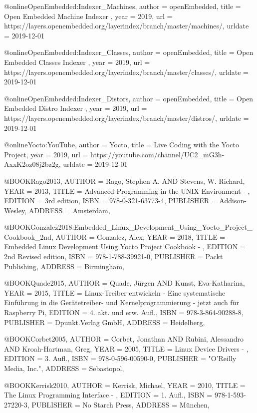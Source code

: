 @online{OpenEmbedded:Indexer_Machines,
author = {openEmbedded},
title = {Open Embedded Machine Indexer },
year = 2019,
url = {https://layers.openembedded.org/layerindex/branch/master/machines/},
urldate = {2019-12-01}
}

@online{OpenEmbedded:Indexer_Classes,
author = {openEmbedded},
title = {Open Embedded Classes Indexer },
year = 2019,
url = {https://layers.openembedded.org/layerindex/branch/master/classes/},
urldate = {2019-12-01}
}

@online{OpenEmbedded:Indexer_Distors,
author = {openEmbedded},
title = {Open Embedded Distro Indexer },
year = 2019,
url = {https://layers.openembedded.org/layerindex/branch/master/distros/},
urldate = {2019-12-01}
}

@online{Yocto:YouTube,
author = {Yocto},
title = {Live Coding with the Yocto Project},
year = 2019,
url = {https://youtube.com/channel/UC2_mG3h-AxxK2oz08j2bz2g},
urldate = {2019-12-01}
}

@BOOK{Rago2013,
	AUTHOR = {Rago, Stephen A. AND Stevens, W. Richard},
	YEAR = {2013},
	TITLE = {Advanced Programming in the UNIX Environment - },
	EDITION = {3rd edition},
	ISBN = {978-0-321-63773-4},
	PUBLISHER = {Addison-Wesley},
	ADDRESS = {Amsterdam},
}


@BOOK{Gonzalez2018:Embedded_Linux_Development_Using_Yocto_Project_Cookbook_2nd,
	AUTHOR = {Gonzalez, Alex},
	YEAR = {2018},
	TITLE = {Embedded Linux Development Using Yocto Project Cookbook - },
	EDITION = {2nd Revised edition},
	ISBN = {978-1-788-39921-0},
	PUBLISHER = {Packt Publishing},
	ADDRESS = {Birmingham},
}


@BOOK{Quade2015,
	AUTHOR = {Quade, Jürgen AND Kunst, Eva-Katharina},
	YEAR = {2015},
	TITLE = {Linux-Treiber entwickeln - Eine systematische Einführung in die Gerätetreiber- und Kernelprogrammierung - jetzt auch für Raspberry Pi},
	EDITION = {4. akt. und erw. Aufl.},
	ISBN = {978-3-864-90288-8},
	PUBLISHER = {Dpunkt.Verlag GmbH},
	ADDRESS = {Heidelberg},
}


@BOOK{Corbet2005,
	AUTHOR = {Corbet, Jonathan AND Rubini, Alessandro AND Kroah-Hartman, Greg},
	YEAR = {2005},
	TITLE = {Linux Device Drivers - },
	EDITION = {3. Aufl.},
	ISBN = {978-0-596-00590-0},
	PUBLISHER = {"O'Reilly Media, Inc."},
	ADDRESS = {Sebastopol},
}

@BOOK{Kerrisk2010,
	AUTHOR = {Kerrisk, Michael},
	YEAR = {2010},
	TITLE = {The Linux Programming Interface - },
	EDITION = {1. Aufl.},
	ISBN = {978-1-593-27220-3},
	PUBLISHER = {No Starch Press},
	ADDRESS = {München},
}



